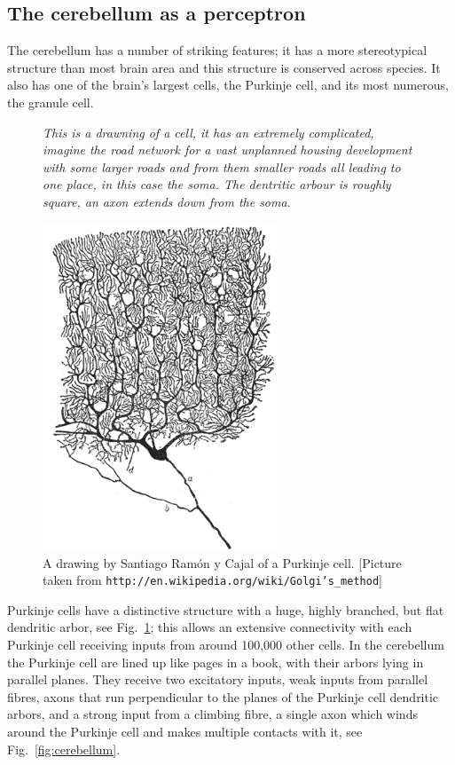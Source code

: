 \documentclass[12pt]{article}
\begin{document}
\subsection*{The cerebellum as a perceptron}

The cerebellum has a number of striking features; it has a more
stereotypical structure than most brain area and this structure is
conserved across species. It also has one of the brain's largest cells,
the Purkinje cell, and its most numerous, the granule cell.

\begin{figure}
             {{\textsl{This is a drawning of a cell, it has an extremely complicated, imagine the road network for a vast unplanned housing development with some larger roads and from them smaller roads all leading to one place, in this case the soma. The dentritic arbour is roughly square, an axon extends down from the soma.}}}
             {
  \begin{center}
\includegraphics[width=7cm]{Purkinje_cell_by_Cajal.png}
  \end{center}
  }
\caption{A drawing by Santiago Ram\'{o}n y Cajal of a Purkinje cell. [Picture taken from \texttt{http://en.wikipedia.org/wiki/Golgi's\_method}]\label{fig:PC}}
\end{figure}

Purkinje cells have a distinctive structure with a huge, highly
branched, but flat dendritic arbor, see Fig.~\ref{fig:PC}; this allows
an extensive connectivity with each Purkinje cell receiving inputs
from around 100,000 other cells. In the cerebellum the Purkinje cell
are lined up like pages in a book, with their arbors lying in parallel
planes. They receive two excitatory inputs, weak inputs from parallel
fibres, axons that run perpendicular to the planes of the Purkinje
cell dendritic arbors, and a strong input from a climbing fibre, a
single axon which winds around the Purkinje cell and makes multiple
contacts with it, see Fig.~\ref{fig:cerebellum}.
\end{document}
